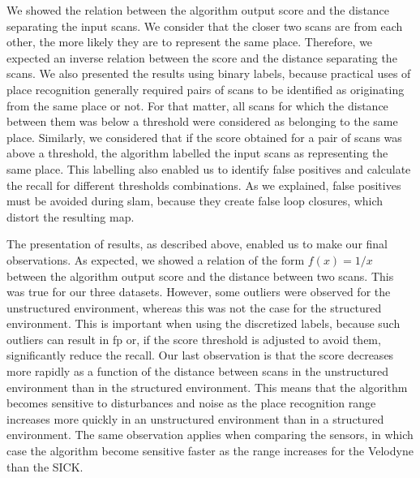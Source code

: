 
We showed the relation between the algorithm output score and the distance separating the input scans. We consider that the closer two scans are from each other, the more likely they are to represent the same place. Therefore, we expected an inverse relation between the score and the distance separating the scans. We also presented the results using binary labels, because practical uses of place recognition generally required pairs of scans to be identified as originating from the same place or not. For that matter, all scans for which the distance between them was below a threshold were considered as belonging to the same place. Similarly, we considered that if the score obtained for a pair of scans was above a threshold, the algorithm labelled the input scans as representing the same place. This labelling also enabled us to identify false positives and calculate the recall for different thresholds combinations. As we explained, false positives must be avoided during \gls*{slam}, because they create false loop closures, which distort the resulting map. 

The presentation of results, as described above, enabled us to make our final observations. As expected, we showed a relation of the form $f(x)=1/x$ between the algorithm output score and the distance between two scans. This was true for our three datasets. However, some outliers were observed for the unstructured environment, whereas this was not the case for the structured environment. This is important when using the discretized labels, because such outliers can result in \gls*{fp} or, if the score threshold is adjusted to avoid them, significantly reduce the recall. Our last observation is that the score decreases more rapidly as a function of the distance between scans in the unstructured environment than in the structured environment. This means that the algorithm becomes sensitive to disturbances and noise as the place recognition range increases more quickly in an unstructured environment than in a structured environment. The same observation applies when comparing the sensors, in which case the algorithm become sensitive faster as the range increases for the Velodyne than the SICK.

